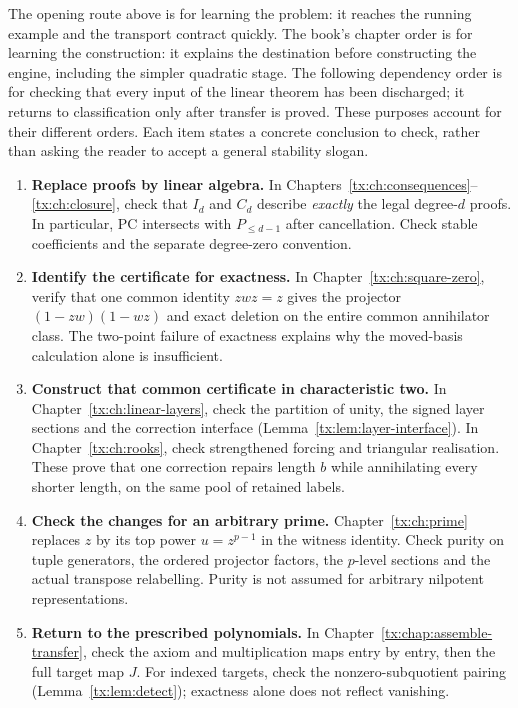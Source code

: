 \documentclass[11pt,a4paper,oneside,openany]{book}
\theoremstyle{definition}\newtheorem{definition}[theorem]{Definition}
\theoremstyle{remark}\newtheorem{remark}[theorem]{Remark}
\numberwithin{equation}{chapter}
\begin{document}
The opening route above is for learning the problem: it reaches the
running example and the transport contract quickly. The book's chapter
order is for learning the construction: it explains the destination
before constructing the engine, including the simpler quadratic stage.
The following dependency order is for checking that every input of the
linear theorem has been discharged; it returns to classification only
after transfer is proved. These purposes account for their different
orders. Each item
states a concrete conclusion to check, rather than asking the reader to
accept a general stability slogan.
\begin{enumerate}
\item \textbf{Replace proofs by linear algebra.}
In Chapters~\ref{tx:ch:consequences}--\ref{tx:ch:closure}, check that
$I_d$ and $C_d$ describe \emph{exactly} the legal degree-$d$ proofs.
In particular, PC intersects with $P_{\le d-1}$ after cancellation.
Check stable coefficients and the separate degree-zero convention.
\item \textbf{Identify the certificate for exactness.}
In Chapter~\ref{tx:ch:square-zero}, verify that one common identity
$zwz=z$ gives the projector $(1-zw)(1-wz)$ and exact deletion on
the entire common annihilator class. The two-point failure of exactness
explains why the moved-basis calculation alone is insufficient.
\item \textbf{Construct that common certificate in characteristic two.}
In Chapter~\ref{tx:ch:linear-layers}, check the partition of unity,
the signed layer sections and the correction interface
(Lemma~\ref{tx:lem:layer-interface}). In Chapter~\ref{tx:ch:rooks},
check strengthened forcing and triangular realisation. These prove that
one correction repairs length $b$ while annihilating every shorter
length, on the same pool of retained labels.
\item \textbf{Check the changes for an arbitrary prime.}
Chapter~\ref{tx:ch:prime} replaces $z$ by its top power
$u=z^{p-1}$ in the witness identity. Check purity on tuple generators,
the ordered projector factors, the $p$-level sections and the actual
transpose relabelling. Purity is not assumed for arbitrary nilpotent
representations.
\item \textbf{Return to the prescribed polynomials.}
In Chapter~\ref{tx:chap:assemble-transfer}, check the axiom and
multiplication maps entry by entry, then the full target map $J$.
For indexed targets, check the nonzero-subquotient pairing
(Lemma~\ref{tx:lem:detect}); exactness alone does not reflect vanishing.

\end{enumerate}
\end{document}
